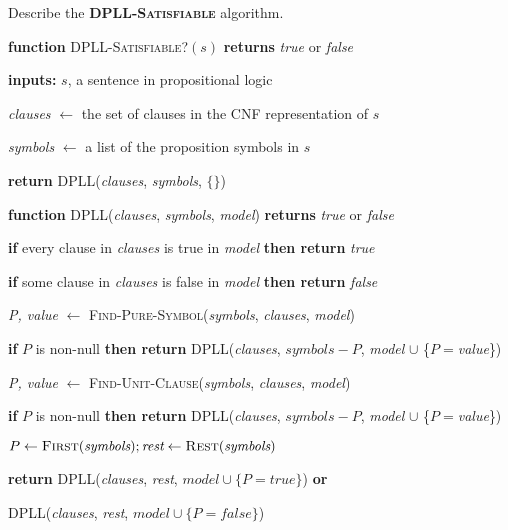 \begin{flashcard}[Question]{Describe the \textbf{\textsc{DPLL-Satisfiable}} algorithm.}
\footnotesize
\begin{center}
\begin{minipage}{0.9\textwidth}
\textbf{function} \textsc{DPLL-Satisfiable?}$(s)$ \textbf{returns} \textit{true} or \textit{false}

\quad \textbf{inputs:} $s$, a sentence in propositional logic

\quad \textit{clauses} $\leftarrow$ the set of clauses in the CNF representation of $s$

\quad \textit{symbols} $\leftarrow$ a list of the proposition symbols in $s$

\quad \textbf{return} DPLL(\textit{clauses}, \textit{symbols}, $\{\}$)

\medskip

\textbf{function} DPLL(\textit{clauses}, \textit{symbols}, \textit{model}) \textbf{returns} \textit{true} or \textit{false}

\quad \textbf{if} every clause in \textit{clauses} is true in \textit{model} \textbf{then return} \textit{true}

\quad \textbf{if} some clause in \textit{clauses} is false in \textit{model} \textbf{then return} \textit{false}

\quad \textit{P, value} $\leftarrow$ \textsc{Find-Pure-Symbol}(\textit{symbols}, \textit{clauses}, \textit{model})

\quad \textbf{if} $P$ is non-null \textbf{then return} DPLL(\textit{clauses}, $\textit{symbols} - P$, \textit{model} $\cup$ \{$P=$\textit{value}\})

\quad \textit{P, value} $\leftarrow$ \textsc{Find-Unit-Clause}(\textit{symbols}, \textit{clauses}, \textit{model})

\quad \textbf{if} $P$ is non-null \textbf{then return} DPLL(\textit{clauses}, $\textit{symbols} - P$, \textit{model} $\cup$ \{$P=$\textit{value}\})

\quad $P \leftarrow \textsc{First}(\textit{symbols}); \textit{rest} \leftarrow \textsc{Rest}(\textit{symbols})$

\quad \textbf{return} DPLL(\textit{clauses}, \textit{rest}, $\textit{model} \cup \{ P = \textit{true} \}$) \textbf{or}

\quad \quad \quad \;\;\;\;\;\! DPLL(\textit{clauses}, \textit{rest}, $\textit{model} \cup \{ P = \textit{false} \}$)
\end{minipage}
\end{center}
\end{flashcard}


